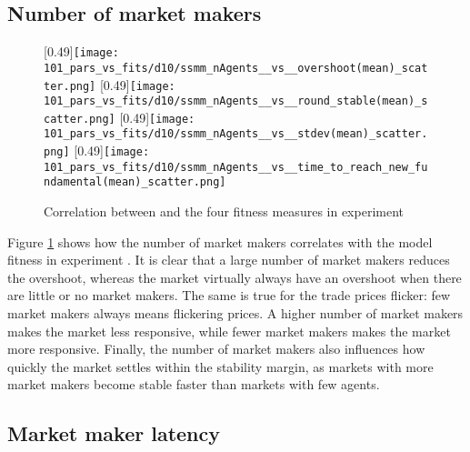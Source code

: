 \subsection{Number of market makers}
\begin{figure}
	\centering
	[0.49\linewidth]{\texttt{[image: 101\_pars\_vs\_fits/d10/ssmm\_nAgents\_\_vs\_\_overshoot(mean)\_scatter.png]}}
	[0.49\linewidth]{\texttt{[image: 101\_pars\_vs\_fits/d10/ssmm\_nAgents\_\_vs\_\_round\_stable(mean)\_scatter.png]}}
	[0.49\linewidth]{\texttt{[image: 101\_pars\_vs\_fits/d10/ssmm\_nAgents\_\_vs\_\_stdev(mean)\_scatter.png]}}
	[0.49\linewidth]{\texttt{[image: 101\_pars\_vs\_fits/d10/ssmm\_nAgents\_\_vs\_\_time\_to\_reach\_new\_fundamental(mean)\_scatter.png]}}
	\caption{Correlation between \ssmmnAgents and the four fitness measures in experiment \dten}
	\label{fig:d10_parvfit_ssmmnAgents}
\end{figure}
Figure \ref{fig:d10_parvfit_ssmmnAgents} shows how the number of market makers correlates with the model fitness in experiment \dten. It is clear that a large number of market makers reduces the overshoot, whereas the market virtually always have an overshoot when there are little or no market makers. The same is true for the trade prices flicker: few market makers always means flickering prices. A higher number of market makers makes the market less responsive, while fewer market makers makes the market more responsive. Finally, the number of market makers also influences how quickly the market settles within the stability margin, as markets with more market makers become stable faster than markets with few agents. 

\subsection{Market maker latency}


